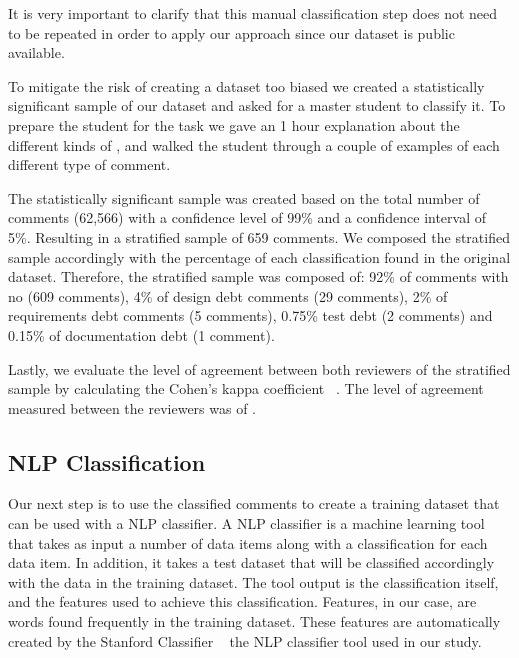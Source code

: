 It is very important to clarify that this manual classification step does not need to be repeated in order to apply our approach since our dataset is public available.   

To mitigate the risk of creating a dataset too biased we created a statistically significant sample of our dataset and asked for a master student to classify it. To prepare the student for the task we gave an 1 hour explanation about the different kinds of \SATD, and walked the student through a couple of examples of each different type of \SATD comment. 

The statistically significant sample was created based on the total number of comments (62,566) with a confidence level of 99\% and a confidence interval of 5\%. Resulting in a stratified sample of 659 comments. We composed the stratified sample accordingly with the percentage of each classification found in the original dataset. Therefore, the stratified sample was composed of: 92\% of comments with no \SATD (609 comments), 4\% of design debt comments (29 comments), 2\% of requirements debt comments (5 comments), 0.75\% test debt (2 comments) and 0.15\% of documentation debt (1 comment).

Lastly, we evaluate the level of agreement between both reviewers of the stratified sample by calculating the Cohen's kappa coefficient ~\cite{cohen1960coefficient}. The level of agreement measured between the reviewers was of \todo{}.   
 

\subsection{NLP Classification} %
\label{sub:run_the_nlp_classifier}


Our next step is to use the classified \SATD comments to create a training dataset that can be used with a NLP classifier. A NLP classifier is a machine learning tool that takes as input a number of data items along with a classification for each data item. In addition, it takes a test dataset that will be classified accordingly with the data in the training dataset. The tool output is the classification itself, and the features used to achieve this classification. Features, in our case, are words found frequently in the training dataset. These features are automatically created by the Stanford Classifier ~\cite{Manning2014ACL} the NLP classifier tool used in our study. 

